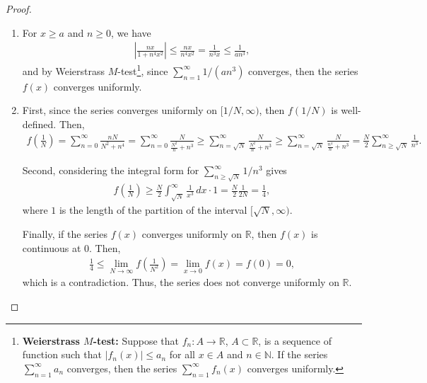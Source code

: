 \documentclass[11pt]{article}
\theoremstyle{definition}
\numberwithin{equation}{subsection}
\begin{document}
\begin{proof}
~\begin{enumerate}[label=(\alph*)]
    \item For $x \geq a$ and $n \geq 0$, we have
    \begin{align*}
        \left|\frac{nx}{1 + n^4x^2}\right| \leq \frac{nx}{n^4x^2} = \frac{1}{n^3x} \leq \frac{1}{an^3},
    \end{align*}
    and by Weierstrass $M$-test\footnote{{\bf Weierstrass $M$-test:} Suppose that $f_n: A \to \mathbb{R}$, $A \subset \mathbb{R}$, is a sequence of function such that $|f_n(x)| \leq a_n$ for all $x \in A$ and $n \in \mathbb{N}$. If the series $\sum^\infty_{n=1}a_n$ converges, then the series $\sum^\infty_{n=1}f_n(x)$ converges uniformly.}, since $\sum^\infty_{n=1} 1/\left(an^3\right)$ converges, then the series $f(x)$ converges uniformly.
    
    \item First, since the series converges uniformly on $[1/N, \infty)$, then $f(1/N)$ is well-defined. Then,
    \begin{align*}
        f\left(\frac{1}{N}\right) = \sum^\infty_{n=0} \frac{nN}{N^2 + n^4} = \sum^\infty_{n=0} \frac{N}{\frac{N^2}{n} + n^3} \geq \sum^\infty_{n=\sqrt{N}} \frac{N}{\frac{N^2}{n} + n^3} \geq \sum^\infty_{n=\sqrt{N}} \frac{N}{\frac{n^4}{n} + n^3} = \frac{N}{2} \sum^\infty_{n\geq \sqrt{N}} \frac{1}{n^3}.
    \end{align*}
    
    Second, considering the integral form for $\sum^\infty_{n\geq \sqrt{N}} 1/n^3$ gives
    \begin{align*}
        f\left(\frac{1}{N}\right) \geq \frac{N}{2} \int^\infty_{\sqrt{N}} \frac{1}{x^3}\, dx \cdot 1 = \frac{N}{2} \frac{1}{2N} = \frac{1}{4},
    \end{align*}
    where $1$ is the length of the partition of the interval $[\sqrt{N}, \infty)$. 
    
    Finally, if the series $f(x)$ converges uniformly on $\mathbb{R}$, then $f(x)$ is continuous at $0$. Then,
    \begin{align*}
        \frac{1}{4} \leq \lim_{N \to \infty} f\left(\frac{1}{N^2}\right) = \lim_{x\to 0} f(x) = f(0) = 0,
    \end{align*}
    which is a contradiction. Thus, the series does not converge uniformly on $\mathbb{R}$.
\end{enumerate}
\end{proof}
\end{document}
